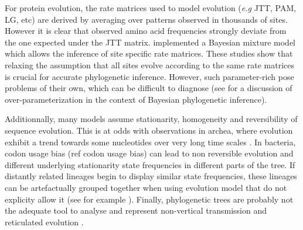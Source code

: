 For protein evolution, the rate matrices used to model evolution (\emph{e.g} JTT, PAM, LG, etc) are derived by averaging over patterns observed in thousands of sites. However it is clear \citep{halpern1998evolutionary,parisi2001structural,susko2002testing} that observed amino acid frequencies strongly deviate from the one expected under the JTT matrix. \citet{lartillot2004bayesian} implemented a Bayesian mixture model which allows the inference of site specific rate matrices. These studies show that relaxing the assumption that all sites evolve according to the same rate matrices is crucial for accurate phylogenetic inference. However, such parameter-rich pose problems of their own, which can be difficult to diagnose (see \citet{rannala2002identifiability} for a  discussion of over-parameterization in the context of Bayesian phylogenetic inference).

Additionnally, many models  assume stationarity, homogeneity and reversibility of sequence evolution. This is at odds with observations in archea, where evolution exhibit a trend towards some nucleotides over very long time scales \citep{boussau2006efficient}. In bacteria, codon usage bias (ref codon usage bias) can lead to non reversible evolution and different underlying stationarity state frequencies in different parts of the tree. If distantly related lineages begin to display similar state frequencies, these lineages can be artefactually grouped together when using evolution model that do not explicity allow it (see for example \cite{foster2004modeling,jermiin2004biasing}). Finally, phylogenetic trees are probably not the adequate tool to analyse and represent non-vertical transmission and reticulated evolution \citep{huson2005application}.




